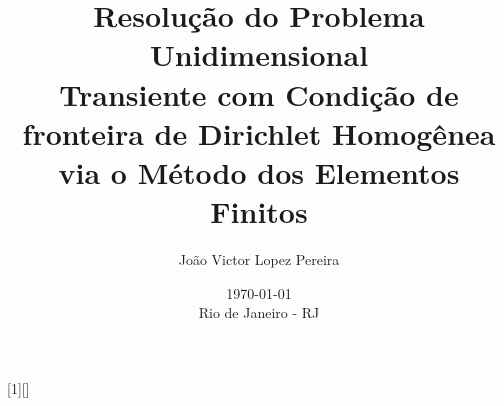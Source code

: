 \usepackage[brazil]{babel}                %
\usepackage[utf8]{inputenc}               %
\usepackage[T1]{fontenc}                  %

\usepackage{graphicx}                     %
\usepackage{float}                        %

\usepackage{tocloft}                      %
\usepackage{hyperref}                     %
\usepackage{csquotes}                     %
\usepackage[backend=biber]{biblatex}      %
\graphicspath{{figures/}}                 %

\usepackage{cancel}
\usepackage[top=1in, bottom=1in, left=0.5in, right=0.5in]{geometry}
\usepackage{amsmath, amssymb}             %
\usepackage{fancyvrb}                     %
\usepackage{upquote}                      %
\usepackage{indentfirst}                  %
\usepackage{listings}                     %
\setlength{\parskip}{\baselineskip}       %
\setlength{\footnotesep}{0.8em}           %
\setlength{\skip\footins}{2em}            %
\setlength{\cftbeforechapskip}{12pt}      %
\setlength{\cftbeforesecskip}{6pt}        %
\setlength{\jot}{10pt}

\title{
  Resolução do Problema Unidimensional \\
  Transiente com Condição de \\
  fronteira de Dirichlet Homogênea \\
  via o Método dos Elementos Finitos
}

\date{
  \today\\
  \vfill
  Rio de Janeiro - RJ
}

\author{
  João Victor Lopez Pereira
}

[1][]{             %
  \lstset{
    basicstyle=\ttfamily,
    columns=flexible,                      %
    breaklines=true,
    breakatwhitespace=true,
    frame=none,
    basewidth=0.5em,                       %
    aboveskip=13pt,
    belowskip=0pt,
    #1
  }
}{}

